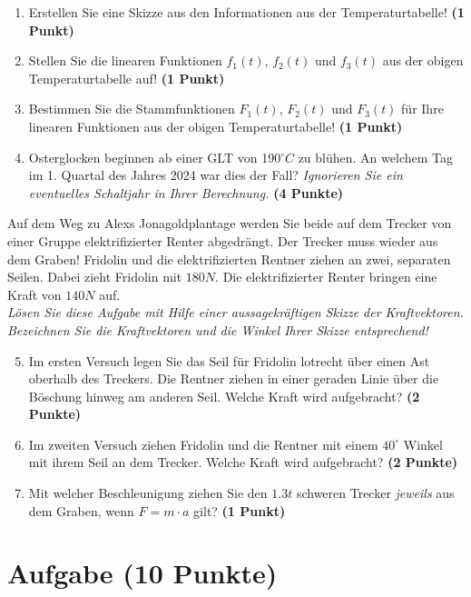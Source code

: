 \documentclass[a4paper, 9pt]{scrartcl}\usepackage[]{graphicx}\usepackage[]{xcolor}
\begin{document}
\begin{enumerate}
\item Erstellen Sie eine Skizze aus den Informationen aus der Temperaturtabelle!  \textbf{(1 Punkt)}
\item Stellen Sie die linearen Funktionen $f_1(t)$, $f_2(t)$ und $f_3(t)$ aus der obigen Temperaturtabelle auf!  \textbf{(1 Punkt)}
\item Bestimmen Sie die Stammfunktionen $F_1(t)$, $F_2(t)$ und $F_3(t)$ für Ihre linearen Funktionen aus der obigen Temperaturtabelle!  \textbf{(1 Punkt)}
\item Osterglocken beginnen ab einer GLT von 190$^\circ C$ zu blühen. An welchem Tag im 1. Quartal des Jahres 2024 war dies der Fall? \textit{Ignorieren Sie ein eventuelles Schaltjahr in Ihrer Berechnung.} \textbf{(4 Punkte)}
\end{enumerate}

Auf dem Weg zu Alexs Jonagoldplantage werden Sie beide auf dem Trecker von einer Gruppe elektrifizierter Renter abgedrängt. Der Trecker muss wieder aus dem Graben! Fridolin und die elektrifizierten Rentner ziehen an zwei, separaten Seilen. Dabei zieht Fridolin mit $180N$. Die elektrifizierter Renter  bringen eine Kraft von $140N$ auf.\\

\textit{Lösen Sie diese Aufgabe mit Hilfe einer aussagekräftigen Skizze der Kraftvektoren. Bezeichnen Sie die Kraftvektoren und die Winkel Ihrer Skizze entsprechend!}

\begin{enumerate}
  \setcounter{enumi}{4}  
\item Im ersten Versuch legen Sie das Seil für Fridolin lotrecht über einen Ast oberhalb des Treckers. Die Rentner ziehen in einer geraden Linie über die Böschung hinweg am anderen Seil. Welche Kraft wird aufgebracht?  \textbf{(2 Punkte)}
\item Im zweiten Versuch ziehen Fridolin und die Rentner mit einem $40^\circ$ Winkel mit ihrem Seil an dem Trecker. Welche Kraft wird aufgebracht? \textbf{(2 Punkte)}
\item Mit welcher Beschleunigung ziehen Sie den $1.3t$ schweren Trecker \textit{jeweils} aus dem Graben, wenn $F = m \cdot a$ gilt? \textbf{(1 Punkt)}
\end{enumerate}

 
\clearpage

\section{Aufgabe \hfill (10 Punkte)}
\end{document}
